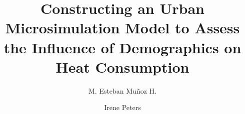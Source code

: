 \documentclass[11pt]{IJM-article}
\begin{document}

\title{Constructing an Urban Microsimulation Model to Assess the Influence of
Demographics on Heat Consumption}
 

\author[Munoz]{M. Esteban Mu\~noz H.}
\address{Technical Urban Infrastructure Systems Group, HafenCity University\\
         Hamburg, Germany}

\author[Peters]{Irene Peters}
\address{Technical Urban Infrastructure Systems Group, HafenCity University\\
         Hamburg, Germany}





\end{document}
